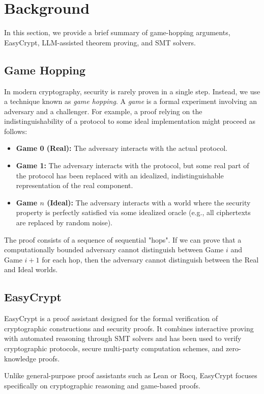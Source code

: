 \documentclass[acmsmall,natbib=false]{acmart}
\begin{document}
\section{Background}
In this section, we provide a brief summary of game-hopping arguments, EasyCrypt, LLM-assisted theorem proving, and SMT solvers.
\subsection{Game Hopping}
In modern cryptography, security is rarely proven in a single step. Instead, we use a technique known as \textit{game hopping}. A \textit{game} is a formal experiment involving an adversary and a challenger. For example, a proof relying on the indistinguishability of a protocol to some ideal implementation might proceed as follows:
\begin{itemize}
    \item \textbf{Game 0 (Real):} The adversary interacts with the actual protocol.
    \item \textbf{Game 1:} The adversary interacts with the protocol, but some real part of the protocol has been replaced with an idealized, indistinguishable representation of the real component.
    \item \textbf{Game $n$ (Ideal):} The adversary interacts with a world where the security property is perfectly satisfied via some idealized oracle (e.g., all ciphertexts are replaced by random noise).
\end{itemize}

The proof consists of a sequence of sequential "hops". If we can prove that a computationally bounded adversary cannot distinguish between Game $i$ and Game $i+1$ for each hop, then the adversary cannot distinguish between the Real and Ideal worlds. 

\subsection{EasyCrypt}
EasyCrypt is a proof assistant designed for the formal verification of cryptographic constructions and security proofs. It combines interactive proving with automated reasoning through SMT solvers and has been used to verify cryptographic protocols, secure multi-party computation schemes, and zero-knowledge proofs.

Unlike general-purpose proof assistants such as Lean or Rocq, EasyCrypt focuses specifically on cryptographic reasoning and game-based proofs.
\end{document}
